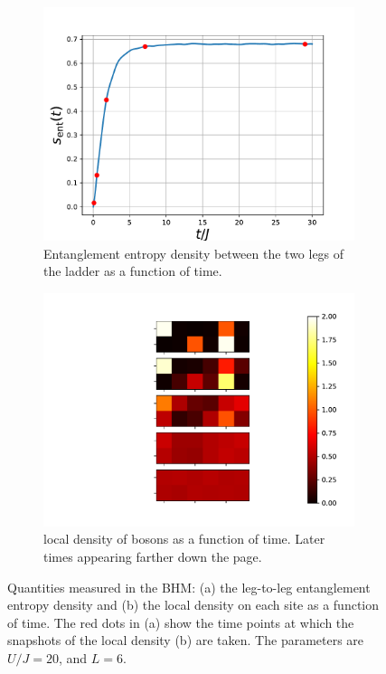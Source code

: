\documentclass{SciPost}
\newcommand\0{\scalebox{-1}[1]{0}}
\begin{document}
\begin{figure}[t!]
	\centering
	\begin{subfigure}[b]{0.496\textwidth}
		\includegraphics[width=\textwidth]{boson_entropy.pdf}
		\caption{Entanglement entropy density between the two legs of the ladder as a function of time.}
	\end{subfigure}
	\begin{subfigure}[b]{0.496\textwidth}
		\includegraphics[width=\textwidth]{boson_density.pdf}
		\caption{local density of bosons as a function of time. Later times appearing farther down the page.}
	\end{subfigure}
	\caption{\label{fig:BHM} Quantities measured in the BHM: (a) the leg-to-leg entanglement entropy density and (b) the local density on each site as a function of time. The red dots in (a) show the time points at which the snapshots of the local density (b) are taken. The parameters are $U/J=20$, and $L=6$.}
\end{figure}
\end{document}

